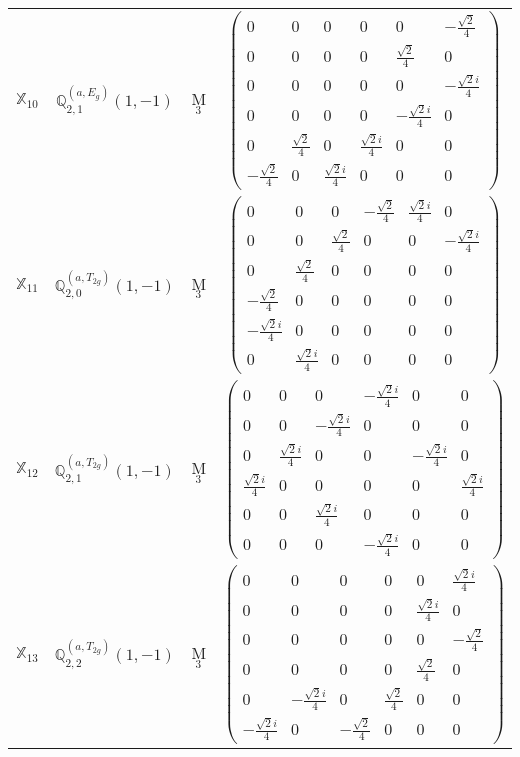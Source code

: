 \documentclass[fleqn,10pt,landscape]{article}
\begin{document}
\begin{itemize}
\begin{center}
\begin{longtable}{c|c|c|c}
$ \mathbb{X}_{10} $ & $\mathbb{Q}_{2,1}^{(a,E_{g})}(1,-1)$ & M$_{3}$ & $\begin{pmatrix} 0 & 0 & 0 & 0 & 0 & - \frac{\sqrt{2}}{4} \\ 0 & 0 & 0 & 0 & \frac{\sqrt{2}}{4} & 0 \\ 0 & 0 & 0 & 0 & 0 & - \frac{\sqrt{2} i}{4} \\ 0 & 0 & 0 & 0 & - \frac{\sqrt{2} i}{4} & 0 \\ 0 & \frac{\sqrt{2}}{4} & 0 & \frac{\sqrt{2} i}{4} & 0 & 0 \\ - \frac{\sqrt{2}}{4} & 0 & \frac{\sqrt{2} i}{4} & 0 & 0 & 0 \end{pmatrix}$ \\
$ \mathbb{X}_{11} $ & $\mathbb{Q}_{2,0}^{(a,T_{2g})}(1,-1)$ & M$_{3}$ & $\begin{pmatrix} 0 & 0 & 0 & - \frac{\sqrt{2}}{4} & \frac{\sqrt{2} i}{4} & 0 \\ 0 & 0 & \frac{\sqrt{2}}{4} & 0 & 0 & - \frac{\sqrt{2} i}{4} \\ 0 & \frac{\sqrt{2}}{4} & 0 & 0 & 0 & 0 \\ - \frac{\sqrt{2}}{4} & 0 & 0 & 0 & 0 & 0 \\ - \frac{\sqrt{2} i}{4} & 0 & 0 & 0 & 0 & 0 \\ 0 & \frac{\sqrt{2} i}{4} & 0 & 0 & 0 & 0 \end{pmatrix}$ \\
$ \mathbb{X}_{12} $ & $\mathbb{Q}_{2,1}^{(a,T_{2g})}(1,-1)$ & M$_{3}$ & $\begin{pmatrix} 0 & 0 & 0 & - \frac{\sqrt{2} i}{4} & 0 & 0 \\ 0 & 0 & - \frac{\sqrt{2} i}{4} & 0 & 0 & 0 \\ 0 & \frac{\sqrt{2} i}{4} & 0 & 0 & - \frac{\sqrt{2} i}{4} & 0 \\ \frac{\sqrt{2} i}{4} & 0 & 0 & 0 & 0 & \frac{\sqrt{2} i}{4} \\ 0 & 0 & \frac{\sqrt{2} i}{4} & 0 & 0 & 0 \\ 0 & 0 & 0 & - \frac{\sqrt{2} i}{4} & 0 & 0 \end{pmatrix}$ \\
$ \mathbb{X}_{13} $ & $\mathbb{Q}_{2,2}^{(a,T_{2g})}(1,-1)$ & M$_{3}$ & $\begin{pmatrix} 0 & 0 & 0 & 0 & 0 & \frac{\sqrt{2} i}{4} \\ 0 & 0 & 0 & 0 & \frac{\sqrt{2} i}{4} & 0 \\ 0 & 0 & 0 & 0 & 0 & - \frac{\sqrt{2}}{4} \\ 0 & 0 & 0 & 0 & \frac{\sqrt{2}}{4} & 0 \\ 0 & - \frac{\sqrt{2} i}{4} & 0 & \frac{\sqrt{2}}{4} & 0 & 0 \\ - \frac{\sqrt{2} i}{4} & 0 & - \frac{\sqrt{2}}{4} & 0 & 0 & 0 \end{pmatrix}$ \\

\end{longtable}
\end{center}
\end{itemize}
\end{document}
